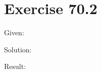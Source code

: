 \documentclass[a4paper, 10pt]{scrartcl}
\begin{document}
\section{Exercise 70.2}

Given:

Solution:

Result:
\end{document}
